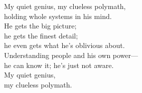 \begin{lyrics}
My quiet genius, my clueless polymath,\\
holding whole systems in his mind.\\
He gets the big picture;\\
he gets the finest detail;\\
he even gets what he’s oblivious about.\\
Understanding people and his own power—\\
he can know it; he’s just not aware.\\
My quiet genius,\\
my clueless polymath.
\end{lyrics}

